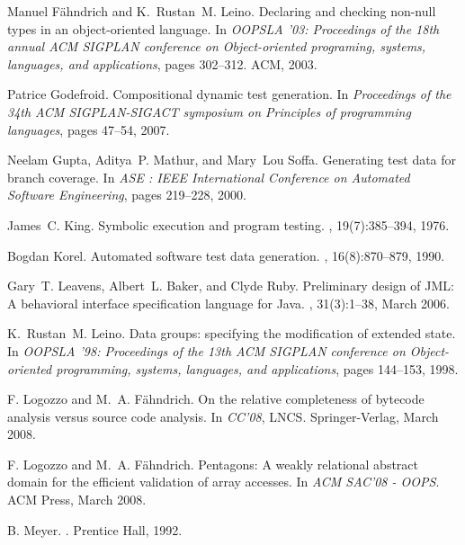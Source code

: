 \documentclass{sig-alternate}
\begin{document}
\begin{thebibliography}{10}
Manuel F\"{a}hndrich and K.~Rustan~M. Leino.
\newblock Declaring and checking non-null types in an object-oriented language.
\newblock In {\em OOPSLA '03: Proceedings of the 18th annual ACM SIGPLAN
  conference on Object-oriented programing, systems, languages, and
  applications}, pages 302--312. ACM, 2003.

Patrice Godefroid.
\newblock Compositional dynamic test generation.
\newblock In {\em Proceedings of the 34th ACM SIGPLAN-SIGACT symposium on
  Principles of programming languages}, pages 47--54, 2007.

Neelam Gupta, Aditya~P. Mathur, and Mary~Lou Soffa.
\newblock Generating test data for branch coverage.
\newblock In {\em ASE : IEEE International Conference on Automated Software
  Engineering}, pages 219--228, 2000.

James~C. King.
\newblock Symbolic execution and program testing.
, 19(7):385--394, 1976.

\pagebreak

Bogdan Korel.
\newblock Automated software test data generation.
, 16(8):870--879,
  1990.

Gary~T. Leavens, Albert~L. Baker, and Clyde Ruby.
\newblock Preliminary design of {JML}: A behavioral interface specification
  language for {Java}.
, 31(3):1--38, March 2006.

K.~Rustan~M. Leino.
\newblock Data groups: specifying the modification of extended state.
\newblock In {\em OOPSLA '98: Proceedings of the 13th ACM SIGPLAN conference on
  Object-oriented programming, systems, languages, and applications}, pages
  144--153, 1998.

F{.} Logozzo and M{.}~A{.} F\"ahndrich.
\newblock On the relative completeness of bytecode analysis versus source code
  analysis.
\newblock In {\em CC'08}, LNCS. Springer-Verlag, March 2008.

F{.} Logozzo and M{.}~A{.} F\"ahndrich.
\newblock Pentagons: A weakly relational abstract domain for the efficient
  validation of array accesses.
\newblock In {\em ACM SAC'08 - OOPS}. ACM Press, March 2008.

B{.} Meyer.
.
\newblock Prentice {H}all, 1992.


\end{thebibliography}
\end{document}
